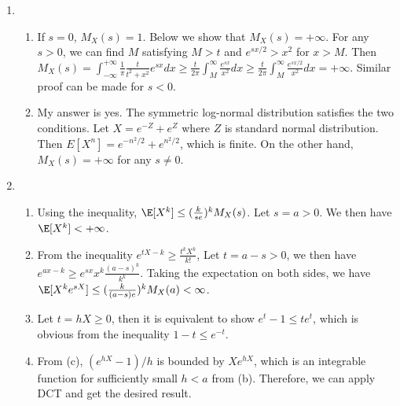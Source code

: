 \documentclass{article}
\begin{document}
\courseheader
{}

\begin{enumerate}
\item 
\begin{enumerate}
    \item If $s=0$, $M_X(s)=1$. Below we show that $M_X(s)=+\infty$.
    For any $s>0$, we can find $M$ satisfying $M>t$ and $e^{sx/2}>x^2$ for $x>M$.
    Then $M_X(s) = \int_{-\infty}^{+\infty} \frac{1}{\pi} \frac{t}{t^2+x^2} e^{sx} dx
    \ge \frac{t}{2\pi} \int_{M}^{\infty} \frac{e^{sx}}{x^2}dx
    \ge \frac{t}{2\pi} \int_{M}^{\infty} \frac{e^{sx/2}}{x^2}dx = +\infty
    $. Similar proof can be made for $s<0$.
    \item My answer is yes. The symmetric log-normal distribution satisfies the two conditions.
    Let $X=e^{-Z}+e^{Z}$ where $Z$ is standard normal distribution. Then $E[X^n] = e^{-n^2/2}+e^{n^2/2}$,
    which is finite. On the other hand, $M_X(s) = +\infty$ for any $s\neq 0$.
\end{enumerate}
\item 
\begin{enumerate}
    \item Using the inequality, $\E[X^k] \leq (\frac{k}{se})^k M_X(s)$.
    Let $s=a>0$. We then have $\E[X^k] < +\infty$.
    \item From the inequality $e^{tX-k} \geq \frac{t^k X^k}{k!}$,
    Let $t=a-s>0$, we then have
    $e^{ax-k} \geq e^{sx} x^k \frac{(a-s)^k}{k^k}$. Taking the expectation on
    both sides, we have
    $\E[X^k e^{sX}] \leq (\frac{k}{(a-s)e})^k M_X(a) < \infty $.
    \item Let $ t = hX \geq 0$, then it is equivalent to show $e^t -1 \leq t e^t$,
    which is obvious from the inequality $1-t \leq e^{-t}$.
    \item From (c), $(e^{hX}-1)/h$ is bounded by $Xe^{hX}$, which is an integrable function for sufficiently small $h<a$ from (b). Therefore, we can apply DCT and get the desired result.
    

\end{enumerate}
\end{enumerate}
\end{document}
